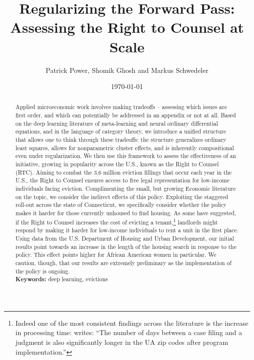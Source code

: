 \documentclass[a4paper,12pt]{article}
\begin{document}
\begin{titlepage}
\title{Regularizing the Forward Pass: Assessing the Right to Counsel at Scale}

\author{Patrick Power, Shomik Ghosh and Markus Schwedeler}
\date{\today}
\maketitle
\thispagestyle{empty} %
\vspace{-2em}
\begin{abstract}
 Applied microeconomic work involves making tradeoffs -- assessing which issues are first order, and which can potentially be addressed in an appendix or not at all. Based on the deep learning literature of meta-learning and neural ordinary differential equations, and in the language of category theory, we introduce a unified structure that allows one to think through these tradeoffs: the structure generalizes ordinary least squares, allows for nonparametric cluster effects, and is inherently compositional even under regularization. We then use this framework to assess the effectiveness of an initiative,  growing in popularity across the U.S., known as the Right to Counsel (RTC). Aiming to combat the 3.6 million eviction fillings that occur each year in the U.S., the Right to Counsel ensures access to free legal representation for low-income individuals facing eviction. Complimenting the small, but growing Economic literature on the topic, we consider the indirect effects of this policy. Exploiting the staggered roll-out across the state of Connecticut, we specifically consider whether the policy makes it harder for those currently unhoused to find housing. As some have suggested, if the Right to Counsel increases the cost of evicting a tenant,\footnote{Indeed one of the most consistent findings across the literature is the increase in processing time: \cite{cassidy2022effects} writes: ``The number of days between a case filing and a judgment is also significantly longer in the UA zip codes after program implementation.''} landlords might respond by making it harder for low-income individuals to rent a unit in the first place. Using data from the U.S. Department of Housing and Urban Development, our initial results point towards an increase in the length of the housing search in response to the policy. This effect points higher for African American women in particular. We caution, though, that our results are extremely preliminary as the implementation of the policy is ongoing.
\vspace{0.2in}\\
\noindent\textbf{Keywords:} deep learning, evictions\\
\end{abstract}
\setcounter{page}{1}
\end{titlepage}
\end{document}
